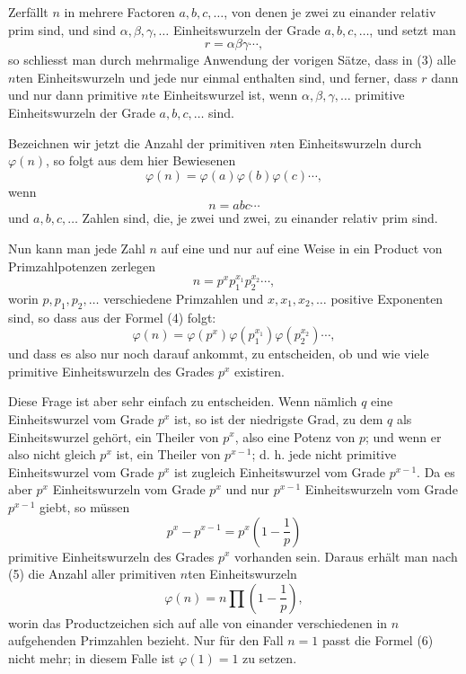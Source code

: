 \documentclass[11pt]{article}
\begin{document}
Zerfällt $n$ in mehrere Factoren $a,b,c,\ldots$, von denen je zwei zu einander relativ prim sind, und sind $\alpha,\beta,\gamma,\ldots$ Einheitswurzeln der Grade $a,b,c,\ldots$, und setzt man
\[
\tag{3}        r=\alpha\beta\gamma\cdots,
\]
so schliesst man durch mehrmalige Anwendung der vorigen Sätze, dass in (3) alle $n$ten Einheitswurzeln und jede nur einmal enthalten sind, und ferner, dass $r$ dann und nur dann primitive $n$te Einheitswurzel ist, wenn $\alpha,\beta,\gamma,\ldots$ primitive Einheitswurzeln der Grade $a,b,c,\ldots$ sind.

Bezeichnen wir jetzt die Anzahl der primitiven $n$ten Einheitswurzeln durch $\varphi(n)$, so folgt aus dem hier Bewiesenen
\[
\tag{4}        \varphi(n)=\varphi(a)\varphi(b)\varphi(c)\cdots,
\]
wenn
\[
        n=abc\cdots
\]
und $a,b,c,\ldots$ Zahlen sind, die, je zwei und zwei, zu einander relativ prim sind.

Nun kann man jede Zahl $n$ auf eine und nur auf eine Weise in ein Product von Primzahlpotenzen zerlegen
\[
        n=p^x p_1^{x_1}p_2^{x_2}\cdots,
\]
worin $p,p_1,p_2,\ldots$ verschiedene Primzahlen und $x,x_1,x_2,\ldots$ positive Exponenten sind, so dass aus der Formel (4) folgt:
\[
\tag{5}        \varphi(n)=\varphi(p^x)\varphi(p_1^{x_1})\varphi(p_2^{x_2})\cdots,
\]
und dass es also nur noch darauf ankommt, zu entscheiden, ob und wie viele primitive Einheitswurzeln des Grades $p^x$ existiren.

Diese Frage ist aber sehr einfach zu entscheiden. Wenn nämlich $q$ eine Einheitswurzel vom Grade $p^x$ ist, so ist der niedrigste Grad, zu dem $q$ als Einheitswurzel gehört, ein Theiler von $p^x$, also eine Potenz von $p$; und wenn er also nicht gleich $p^x$ ist, ein Theiler von $p^{x-1}$; d. h. jede nicht primitive Einheitswurzel vom Grade $p^x$ ist zugleich Einheitswurzel vom Grade $p^{x-1}$. Da es aber $p^x$ Einheitswurzeln vom Grade $p^x$ und nur $p^{x-1}$ Einheitswurzeln vom Grade $p^{x-1}$ giebt, so müssen
\[
        p^x-p^{x-1}=p^x\left(1-\frac1p\right)
\]
primitive Einheitswurzeln des Grades $p^x$ vorhanden sein. Daraus erhält man nach (5) die Anzahl aller primitiven $n$ten Einheitswurzeln
\[
\tag{6}        \varphi(n)=n\prod\left(1-\frac1p\right),
\]
worin das Productzeichen sich auf alle von einander verschiedenen in $n$ aufgehenden Primzahlen bezieht. Nur für den Fall $n=1$ passt die Formel (6) nicht mehr; in diesem Falle ist $\varphi(1)=1$ zu setzen.
\end{document}
